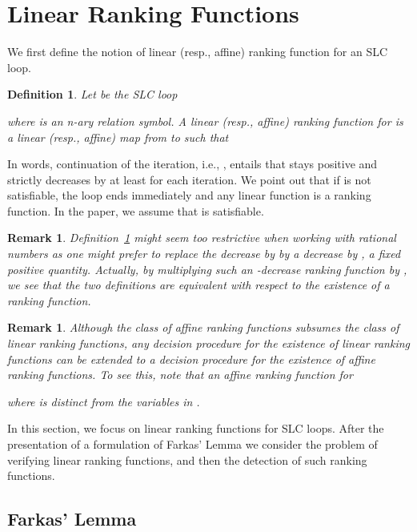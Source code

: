 \documentclass{acm_proc_article-sp}
\newtheorem{definition}[theorem]{Definition}
\newtheorem{remark}[theorem]{Remark}
\begin{document}
\section{Linear Ranking Functions}
\label{sec:linear-ranking-functions}

We first define the notion of linear (resp., affine) ranking function
for an SLC loop.

\begin{definition}
\label{def-fn-rng-lin}
Let  be the SLC loop
 
where  is an n-ary relation symbol.
A \emph{linear} (resp., \emph{affine}) \emph{ranking function}  for 
is a linear (resp., affine) map from  to  such that

\end{definition}

In words, continuation of the iteration, i.e., ,
entails that  stays positive and strictly decreases by at least 
for each iteration.
We point out that if  is not satisfiable,
the loop ends immediately and any linear function is a ranking
function.
In the paper, we assume that  is
satisfiable.

\begin{remark}
\textup{Definition~\ref{def-fn-rng-lin}} might seem too restrictive
when working with rational numbers as one might prefer to replace the
decrease by  by a decrease by , a fixed positive
quantity.  Actually, by multiplying such an -decrease
ranking function by , we see that the two definitions
are equivalent with respect to the existence of a ranking function.
\end{remark}

\begin{remark}
Although the class of affine ranking functions subsumes the class of linear
ranking functions, any decision procedure for the existence of
linear ranking functions can be extended to a decision procedure
for the existence of affine ranking functions.
To see this, note that an affine ranking function for

where  is distinct from the variables in .
\end{remark}

In this section, we focus on linear ranking functions for SLC loops.
After the presentation of a formulation of Farkas' Lemma
we consider the problem of verifying linear ranking
functions, and then the detection of such ranking functions.


\subsection{Farkas' Lemma}
\end{document}
